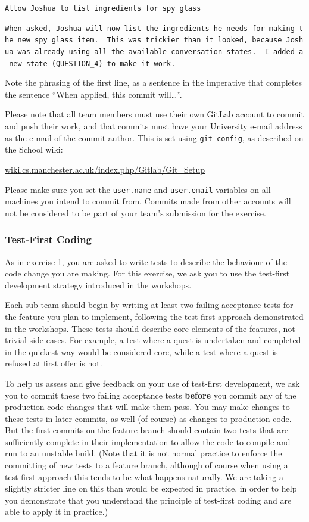 \documentclass[
]{book}
\begin{document}
\texttt{Allow\ Joshua\ to\ list\ ingredients\ for\ spy\ glass}

\texttt{When\ asked,\ Joshua\ will\ now\ list\ the\ ingredients\ he\ needs\ for\ making\ the\ new\ spy\ glass\ item.\ \ This\ was\ trickier\ than\ it\ looked,\ because\ Joshua\ was\ already\ using\ all\ the\ available\ conversation\ states.\ \ I\ added\ a\ new\ state\ (QUESTION\_4)\ to\ make\ it\ work.}

Note the phrasing of the first line, as a sentence in the imperative that completes the sentence ``When applied, this commit will\ldots{}''.

Please note that all team members must use their own GitLab account to commit and push their work, and that commits must have your University e-mail address as the e-mail of the commit author. This is set using \texttt{git\ config}, as described on the School wiki:

\href{https://wiki.cs.manchester.ac.uk/index.php/Gitlab/Git_Setup}{wiki.cs.manchester.ac.uk/index.php/Gitlab/Git\_Setup}

Please make sure you set the \texttt{user.name} and \texttt{user.email} variables on all machines you intend to commit from. Commits made from other accounts will not be considered to be part of your team's submission for the exercise.

\hypertarget{tfcode}{%
\subsubsection*{Test-First Coding}\label{tfcode}}

As in exercise 1, you are asked to write tests to describe the behaviour of the code change you are making. For this exercise, we ask you to use the test-first development strategy introduced in the workshops.

Each sub-team should begin by writing at least two failing acceptance tests for the feature you plan to implement, following the test-first approach demonstrated in the workshops. These tests should describe core elements of the features, not trivial side cases. For example, a test where a quest is undertaken and completed in the quickest way would be considered core, while a test where a quest is refused at first offer is not.

To help us assess and give feedback on your use of test-first development, we ask you to commit these two failing acceptance tests \textbf{before} you commit any of the production code changes that will make them pass. You may make changes to these tests in later commits, as well (of course) as changes to production code. But the first commits on the feature branch should contain two tests that are sufficiently complete in their implementation to allow the code to compile and run to an unstable build. (Note that it is not normal practice to enforce the committing of new tests to a feature branch, although of course when using a test-first approach this tends to be what happens naturally. We are taking a slightly stricter line on this than would be expected in practice, in order to help you demonstrate that you understand the principle of test-first coding and are able to apply it in practice.)
\end{document}
